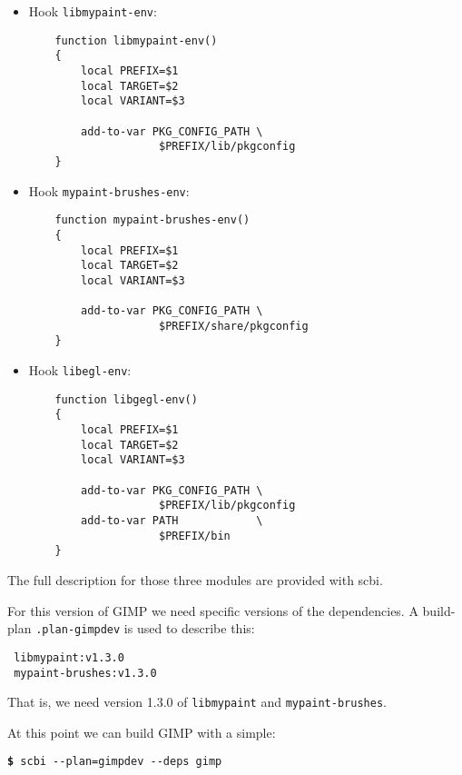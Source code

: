 \documentclass[a4paper,12pt,twoside]{article}
\newcommand{\code}[1]{\texttt{#1}}
\newcommand{\cmd}[1]{\tabto{1cm}\hspace{0.5cm}\texttt{\textbf{\$} #1}}
\newcommand{\ddash}{-{}-}
\begin{document}
\begin{itemize}
	\item Hook \code{libmypaint-env}:

	\begin{lstlisting}
	function libmypaint-env()
	{
		local PREFIX=$1
		local TARGET=$2
		local VARIANT=$3

		add-to-var PKG_CONFIG_PATH \
					$PREFIX/lib/pkgconfig
	}
	\end{lstlisting}

	\item Hook \code{mypaint-brushes-env}:

	\begin{lstlisting}
	function mypaint-brushes-env()
	{
		local PREFIX=$1
		local TARGET=$2
		local VARIANT=$3

		add-to-var PKG_CONFIG_PATH \
					$PREFIX/share/pkgconfig
	}
	\end{lstlisting}

	\item Hook \code{libegl-env}:

	\begin{lstlisting}
	function libgegl-env()
	{
		local PREFIX=$1
		local TARGET=$2
		local VARIANT=$3

		add-to-var PKG_CONFIG_PATH \
					$PREFIX/lib/pkgconfig
		add-to-var PATH            \
					$PREFIX/bin
	}
	\end{lstlisting}

\end{itemize}

The full description for those three modules are provided with scbi.

For this version of GIMP we need specific versions of the dependencies. A build-plan \code{.plan-gimpdev} is used to describe this:

\begin{lstlisting}
 libmypaint:v1.3.0
 mypaint-brushes:v1.3.0
\end{lstlisting}

That is, we need version 1.3.0 of \code{libmypaint} and \code{mypaint-brushes}.

At this point we can build GIMP with a simple:

\cmd{scbi \ddash{}plan=gimpdev \ddash{}deps gimp}

\printindex

\end{document}
